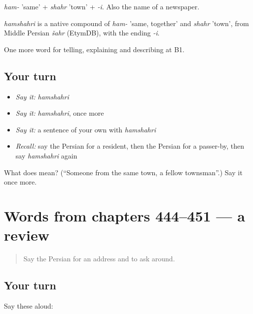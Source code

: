 \emph{ham-} 'same' + \emph{shahr} 'town' + \emph{-i}. Also the name of a newspaper.

\begin{cousinweb}
\emph{hamshahri} is a native compound of \emph{ham-} 'same, together' and \emph{shahr} 'town', from Middle Persian \emph{šahr} (EtymDB), with the ending \emph{-i}.
\end{cousinweb}

\begin{grammarlens}[title={What you've built}]
One more word for telling, explaining and describing at B1.
\end{grammarlens}

\subsection*{Your turn}
\begin{itemize}
\raggedright
  \item \emph{Say it:} \emph{hamshahri}
  \item \emph{Say it:} \emph{hamshahri}, once more
  \item \emph{Say it:} a sentence of your own with \emph{hamshahri}
  \item \emph{Recall:} say the Persian for a resident, then the Persian for a passer-by, then say \emph{hamshahri} again
\end{itemize}

\begin{tcolorbox}[breakable,colback=teal!4,colframe=teal!35!black,title={Before you move on}]
What does  mean? (\textquotedblleft{}Someone from the same town, a fellow townsman\textquotedblright{}.) Say it once more.
\end{tcolorbox}
\section[(dialogue)]{Words from chapters 444–451 — a review}

\label{lesson:FA-R451-review-444-451}



\begin{quote}
Say the Persian for an address and to ask around.
\end{quote}

\subsection*{Your turn}
Say these aloud:


